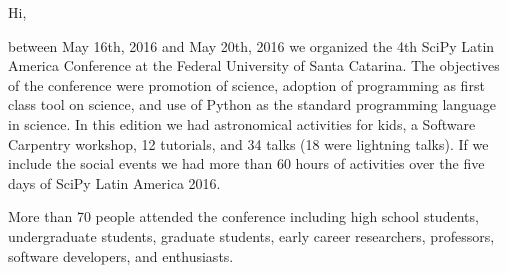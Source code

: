 \documentclass[12pt]{article}
\begin{document}

Hi,

between May 16th, 2016 and May 20th, 2016 we organized the 4th SciPy Latin
America Conference at the Federal University of Santa Catarina.
The objectives of the conference were promotion of science,
adoption of programming as first class tool on science,
and use of Python as the standard programming language in science.
In this edition we had astronomical activities for kids,
a Software Carpentry workshop,
12 tutorials, and 34 talks (18 were lightning talks).
If we include the social events we had more than 60 hours of activities over the
five days of SciPy Latin America 2016.

More than 70 people attended the conference including
high school students,
undergraduate students,
graduate students,
early career researchers,
professors,
software developers,
and 
enthusiasts.
\end{document}
